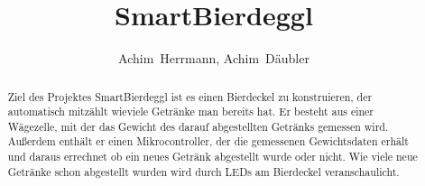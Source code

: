 \documentclass[12pt,journal]{IEEEtran}
\begin{document}
%
\title{SmartBierdeggl}
%
%

\author{Achim~Herrmann,
        Achim~Däubler}

%
{%
}
% 

\maketitle

\begin{abstract}
Ziel des Projektes SmartBierdeggl ist es einen Bierdeckel zu konstruieren, der automatisch mitzählt wieviele Getränke man bereits hat.
Er besteht aus einer Wägezelle, mit der das Gewicht des darauf abgestellten Getränks gemessen wird.
Außerdem enthält er einen Mikrocontroller, der die gemessenen Gewichtsdaten erhält und daraus errechnet ob ein neues Getränk abgestellt wurde oder nicht.
Wie viele neue Getränke schon abgestellt wurden wird durch LEDs am Bierdeckel veranschaulicht.
\end{abstract}
\end{document}

